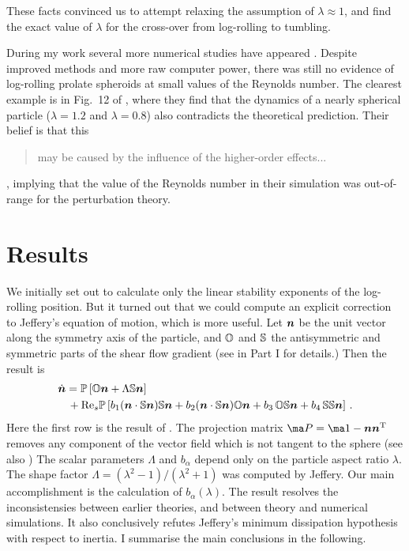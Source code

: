 \documentclass[thesis.tex]{subfiles}
\begin{document}
These facts convinced us to attempt relaxing the assumption of $\lambda\approx1$, and find the exact value of $\lambda$ for the cross-over from log-rolling to tumbling.

During my work several more numerical studies have appeared \cite{rosen2014,mao2014,rosen2015a,rosen2015b}. Despite improved methods and more raw computer power, there was still no evidence of log-rolling prolate spheroids at small values of the Reynolds number. The clearest example is in Fig.~12 of \citet{mao2014}, where they find that the dynamics of a nearly spherical particle ($\lambda=1.2$ and $\lambda=0.8$) also contradicts the theoretical prediction. Their belief is that this \blockquote{may be caused by the influence
of the higher-order effects...}, implying that the value of the Reynolds number in their simulation was out-of-range for the perturbation theory.

\section{Results}

We initially set out to calculate only the linear stability exponents of the log-rolling position. But it turned out that we could compute an explicit correction to Jeffery's equation of motion, which is more useful. Let $\mbox{\boldmath$n$}$ be the unit vector along the symmetry axis of the particle, and $\mathbb{O}$ and $\mathbb{S}$ the antisymmetric and symmetric parts of the shear flow gradient (see  in Part I for details.) Then the result is
\begin{align}
\eqnlab{ndoteffective}
  \dot {\ve n} &=  
\ma P\left[\ma O \ve n + \Lambda\ma S\ve n\right]\\
&\,+\Reys\ma P\left[b_1 (\ve n \cdot \ma S \ve n)\ma S \ve n
+ b_2 (\ve n \cdot \ma S \ve n)\ma O \ve n 
+b_3\,  \ma O \ma S \ve n 
+ b_4\,  \ma S \ma S \ve n\right]\,. \nn
\end{align}
Here the first row is the result of \citet{jeffery1922}. The projection matrix $\ma P=\ma 1 - \ve n \ve n\transpose$ removes any component of the vector field which is not tangent to the sphere (see also ) The scalar parameters $\Lambda$ and $b_\alpha$ depend only on the particle aspect ratio $\lambda$. The shape factor $\Lambda=(\lambda^2-1)/(\lambda^2+1)$ was computed by Jeffery. Our main accomplishment is the calculation of $b_\alpha(\lambda)$.
The result  resolves the inconsistensies between earlier theories, and between theory and numerical simulations. It also conclusively refutes Jeffery's minimum dissipation hypothesis with respect to inertia. I summarise the main conclusions in the following.
\end{document}
